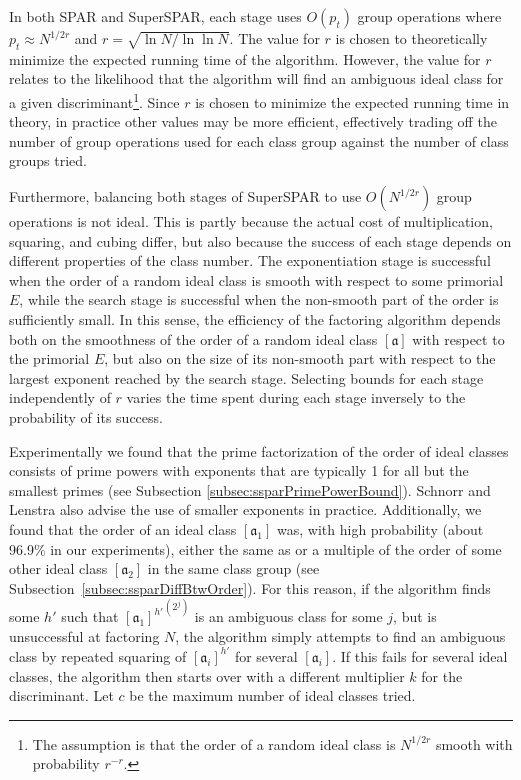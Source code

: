 \documentclass{ucalgthes1}
\theoremstyle{definition}
\newcommand{\ideal}{\mathfrak}
\newcommand{\idealclass}[1]{\left[ \ideal #1 \right]}
\newcommand{\aclass}{\idealclass a}
\begin{document}
In both SPAR and SuperSPAR, each stage uses $O(p_t)$ group operations where $p_t \approx N^{1/2r}$ and $r = \sqrt{\ln N / \ln \ln N}$.  The value for $r$ is chosen to theoretically minimize the expected running time of the algorithm.  However, the value for $r$ relates to the likelihood that the algorithm will find an ambiguous ideal class for a given discriminant\footnote{The assumption is that the order of a random ideal class is $N^{1/2r}$ smooth with probability $r^{-r}$.}.  Since $r$ is chosen to minimize the expected running time in theory, in practice other values may be more efficient, effectively trading off the number of group operations used for each class group against the number of class groups tried.

Furthermore, balancing both stages of SuperSPAR to use $O(N^{1/2r})$ group operations is not ideal.  This is partly because the actual cost of multiplication, squaring, and cubing differ, but also because the success of each stage depends on different properties of the class number.  The exponentiation stage is successful when the order of a random ideal class is smooth with respect to some primorial $E$, while the search stage is successful when the non-smooth part of the order is sufficiently small.  In this sense, the efficiency of the factoring algorithm depends both on the smoothness of the order of a random ideal class $\aclass$ with respect to the primorial $E$, but also on the size of its non-smooth part with respect to the largest exponent reached by the search stage.  Selecting bounds for each stage independently of $r$ varies the time spent during each stage inversely to the probability of its success.

Experimentally we found that the prime factorization of the order of ideal classes consists of prime powers with exponents that are typically 1 for all but the smallest primes (see Subsection \ref{subsec:ssparPrimePowerBound}).  Schnorr and Lenstra \cite[p.293]{Schnorr1984} also advise the use of smaller exponents in practice.  Additionally, we found that the order of an ideal class $[\ideal a_1]$ was, with high probability (about 96.9\% in our experiments), either the same as or a multiple of the order of some other ideal class $[\mathfrak a_2]$ in the same class group (see Subsection~\ref{subsec:ssparDiffBtwOrder}).  For this reason, if the algorithm finds some $h'$ such that ${[\mathfrak a_1]^{h'}}^{\left(2^j\right)}$ is an ambiguous class for some $j$, but is unsuccessful at factoring $N$, the algorithm simply attempts to find an ambiguous class by repeated squaring of $[\mathfrak a_i]^{h'}$ for several $[\mathfrak a_i]$.  If this fails for several ideal classes, the algorithm then starts over with a different multiplier $k$ for the discriminant.  Let $c$ be the maximum number of ideal classes tried.
\end{document}
